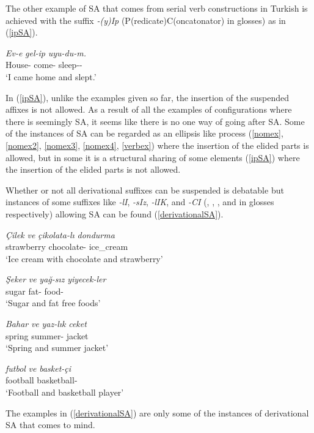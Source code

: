 The other example of SA that comes from serial verb constructions in Turkish is achieved with the suffix \textit{-(y)Ip} (P(redicate)C(oncatonator) in glosses) as in (\ref{ipSA}).

\begin{exe}
    \ex \label{ipSA}
    \gll 
    \textit{Ev-e} \textit{gel-ip} \textit{uyu-du-m.} \\ House-{\Dat} come-{\Pc} sleep-{{\Pst}}-{\First}{\Sg} \\
    \glt `I came home and slept.'
\end{exe}

In (\ref{ipSA}), unlike the examples given so far, the insertion of the suspended affixes is not allowed. As a result of all the examples of configurations where there is seemingly SA, it seems like there is no one way of going after SA. Some of the instances of SA can be regarded as an ellipsis like process (\ref{nomex}, \ref{nomex2}, \ref{nomex3}, \ref{nomex4}, \ref{verbex}) where the insertion of the elided parts is allowed, but in some it is a structural sharing of some elements (\ref{ipSA}) where the insertion of the elided parts is not allowed.

Whether or not all derivational suffixes can be suspended is debatable but instances of some suffixes like \textit{-lI}, \textit{-sIz}, \textit{-lIK}, and \textit{-CI} ({\Inc}, {\Exc}, {\Lik}, and {\Ci} in glosses respectively) allowing SA can be found (\ref{derivationalSA}).

\begin{exe}
    \ex \label{derivationalSA}
    \begin{xlist}

        \ex
        \gll 
        \textit{Çilek} \textit{ve} \textit{çikolata-lı} \textit{dondurma} \\ strawberry {\And} chocolate-{\Inc} ice\_cream \\
        \glt `Ice cream with chocolate and strawberry'
        
        \ex
        \gll
        \textit{Şeker} \textit{ve} \textit{yağ-sız} \textit{yiyecek-ler} \\ sugar {\And} fat-{\Exc} food-{\Pl} \\
        \glt `Sugar and fat free foods'
        
        \ex 
        \gll
        \textit{Bahar} \textit{ve} \textit{yaz-lık} \textit{ceket} \\ spring {\And} summer-{\Lik} jacket \\
        \glt `Spring and summer jacket'
        
        \ex 
        \gll 
        \textit{futbol} \textit{ve} \textit{basket-çi} \\ football {\And} basketball-{\Ci} \\ 
        \glt `Football and basketball player'
    \end{xlist}
\end{exe}

The examples in (\ref{derivationalSA}) are only some of the instances of derivational SA that comes to mind. 
